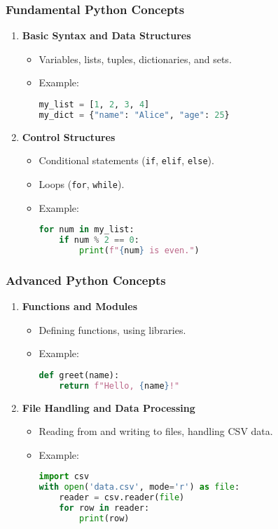 \documentclass[aspectratio=169]{beamer}
\begin{document}
\begin{frame}[fragile]
    \frametitle{Fundamental Python Concepts}
    \begin{enumerate}
        \item \textbf{Basic Syntax and Data Structures}
        \begin{itemize}
            \item Variables, lists, tuples, dictionaries, and sets.
            \item Example:
            \begin{lstlisting}[language=Python]
my_list = [1, 2, 3, 4]
my_dict = {"name": "Alice", "age": 25}
            \end{lstlisting}
        \end{itemize}

        \item \textbf{Control Structures}
        \begin{itemize}
            \item Conditional statements (\texttt{if}, \texttt{elif}, \texttt{else}).
            \item Loops (\texttt{for}, \texttt{while}).
            \item Example:
            \begin{lstlisting}[language=Python]
for num in my_list:
    if num % 2 == 0:
        print(f"{num} is even.")
            \end{lstlisting}
        \end{itemize}
    \end{enumerate}
\end{frame}

\begin{frame}[fragile]
    \frametitle{Advanced Python Concepts}
    \begin{enumerate}[resume]
        \item \textbf{Functions and Modules}
        \begin{itemize}
            \item Defining functions, using libraries.
            \item Example:
            \begin{lstlisting}[language=Python]
def greet(name):
    return f"Hello, {name}!"
            \end{lstlisting}
        \end{itemize}

        \item \textbf{File Handling and Data Processing}
        \begin{itemize}
            \item Reading from and writing to files, handling CSV data.
            \item Example:
            \begin{lstlisting}[language=Python]
import csv
with open('data.csv', mode='r') as file:
    reader = csv.reader(file)
    for row in reader:
        print(row)
            \end{lstlisting}
        \end{itemize}
    \end{enumerate}
\end{frame}
\end{document}

